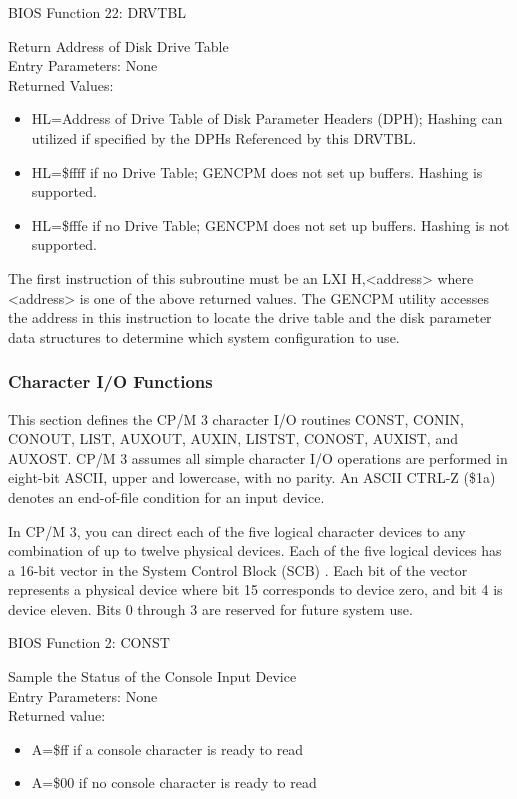 BIOS Function 22: DRVTBL

Return Address of Disk Drive Table\\
Entry Parameters: None\\
Returned Values:
\begin{itemize}
\item[] HL=Address of Drive Table of Disk Parameter Headers (DPH);
  Hashing can utilized if specified by the DPHs Referenced by this
  DRVTBL.
\item[] HL=\$ffff if no Drive Table; GENCPM does not set up buffers.
  Hashing is supported.
\item[] HL=\$fffe if no Drive Table; GENCPM does not set up buffers.
  Hashing is not supported.
\end{itemize}

The first instruction of this subroutine must be an LXI H,<address>
where <address> is one of the above returned values. The GENCPM
utility accesses the address in this instruction to locate the drive
table and the disk parameter data structures to determine which system
configuration to use.

\subsubsection{Character I/O Functions}
This section defines the CP/M 3 character I/O routines CONST, CONIN,
CONOUT, LIST, AUXOUT, AUXIN, LISTST, CONOST, AUXIST, and AUXOST.  CP/M
3 assumes all simple character I/O operations are performed in
eight-bit ASCII, upper and lowercase, with no parity. An ASCII CTRL-Z
(\$1a) denotes an end-of-file condition for an input device.

In CP/M 3, you can direct each of the five logical character devices
to any combination of up to twelve physical devices. Each of the five
logical devices has a 16-bit vector in the System Control Block (SCB)
. Each bit of the vector represents a physical device where bit 15
corresponds to device zero, and bit 4 is device eleven. Bits 0 through
3 are reserved for future system use.

BIOS Function 2: CONST

Sample the Status of the Console Input Device\\
Entry Parameters: None\\
Returned value:
\begin{itemize}
\item[] A=\$ff if a console character is ready to read
\item[] A=\$00 if no console character is ready to read
\end{itemize}
 
